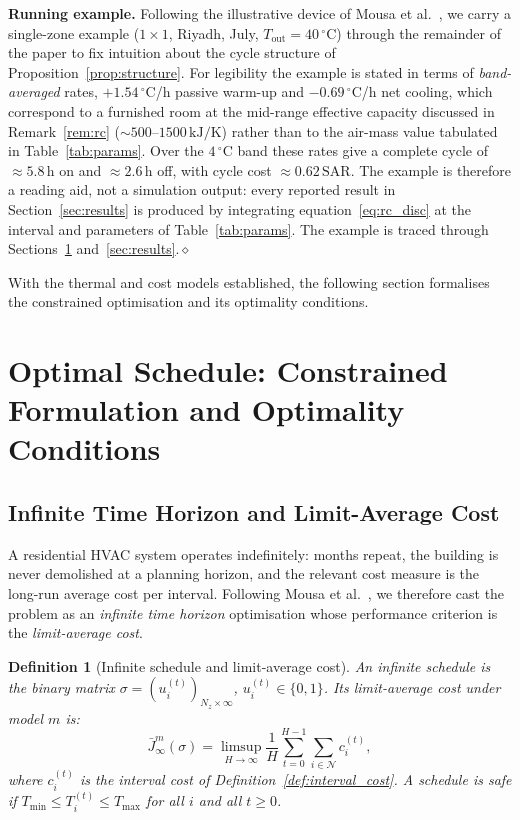 \documentclass[3p,number]{elsarticle}
\let\oldsection\section
\renewcommand{\section}{\FloatBarrier\oldsection}
\let\oldsubsection\subsection
\renewcommand{\subsection}{\FloatBarrier\oldsubsection}
\newtheorem{definition}{Definition} \newtheorem{proposition}{Proposition} \newtheorem{remark}{Remark} \newtheorem{observation}{Observation}
\newcommand{\sched}{\sigma}
\newcommand{\Tmin}{T_{\min}}
\newcommand{\Tmax}{T_{\max}}
\newcommand{\Tout}{T_{\mathrm{out}}}
\newcommand{\SAR}{\text{SAR}}
\begin{document}
\noindent\textbf{Running example.}
Following the illustrative device of Mousa et al.~\cite{Mousa2016}, we carry a
single-zone example ($1\times1$, Riyadh, July, $\Tout=40\,^\circ$C) through the
remainder of the paper to fix intuition about the cycle structure of
Proposition~\ref{prop:structure}. For legibility the example is stated in terms
of \emph{band-averaged} rates, $+1.54\,^\circ$C/h passive warm-up and
$-0.69\,^\circ$C/h net cooling, which correspond to a furnished room at the
mid-range effective capacity discussed in Remark~\ref{rem:rc}
(${\sim}500$--$1500\,\text{kJ/K}$) rather than to the air-mass value tabulated in
Table~\ref{tab:params}. Over the $4\,^\circ$C band these rates give a complete
cycle of ${\approx}5.8$\,h on and ${\approx}2.6$\,h off, with cycle cost
${\approx}0.62\,\SAR$. The example is therefore a reading aid, not a simulation
output: every reported result in Section~\ref{sec:results} is produced by
integrating equation~\eqref{eq:rc_disc} at the interval and parameters of
Table~\ref{tab:params}. The example is traced through
Sections~\ref{sec:schedule} and~\ref{sec:results}.\hfill$\diamond$
 
With the thermal and cost models established, the following section formalises the constrained optimisation and its optimality conditions.
 
\section{Optimal Schedule: Constrained Formulation and Optimality Conditions}
\label{sec:schedule}
 
\subsection{Infinite Time Horizon and Limit-Average Cost}
\label{subsec:infinite}
 
A residential HVAC system operates indefinitely: months repeat, the building is never demolished at a planning horizon, and the relevant cost measure is the long-run average cost per interval.
Following Mousa et al.~\cite{Mousa2016}, we therefore cast the problem as an \emph{infinite time horizon} optimisation whose performance criterion is the \emph{limit-average cost}.
 
\begin{definition}[Infinite schedule and limit-average cost]
\label{def:inf_schedule}
An \emph{infinite schedule} is the binary matrix
$\sched=(u_i^{(t)})_{N_z\times\infty}$, $u_i^{(t)}\in\{0,1\}$.
Its limit-average cost under model $m$ is:
\begin{equation}
  \bar{J}^m_\infty(\sched)
  = \limsup_{H\to\infty}
    \frac{1}{H}\sum_{t=0}^{H-1}\sum_{i\in\mathcal{N}} c_i^{(t)},
  \label{eq:limsup}
\end{equation}
where $c_i^{(t)}$ is the interval cost of Definition~\ref{def:interval_cost}.
A schedule is \emph{safe} if $\Tmin\le T_i^{(t)}\le\Tmax$ for all $i$
and all $t\ge0$.
\end{definition}
 
\end{document}
